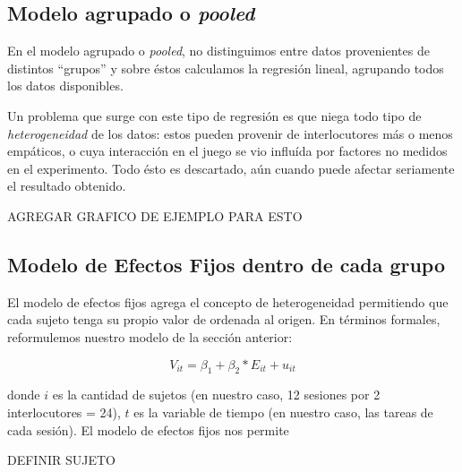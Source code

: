 \subsection{Modelo agrupado o \emph{pooled}}

En el modelo agrupado o \emph{pooled}, no distinguimos entre datos provenientes de distintos ``grupos'' \cite{gujarati1999} y sobre éstos calculamos la regresión lineal, agrupando todos los datos disponibles.

Un problema que surge con este tipo de regresión es que niega todo tipo de \emph{heterogeneidad} de los datos: estos pueden provenir de interlocutores más o menos empáticos, o cuya interacción en el juego se vio influída por factores no medidos en el experimento. Todo ésto es descartado, aún cuando puede afectar seriamente  el resultado obtenido.

AGREGAR GRAFICO DE EJEMPLO PARA ESTO

\subsection{Modelo de Efectos Fijos dentro de cada grupo}


El modelo de efectos fijos agrega el concepto de heterogeneidad permitiendo que cada sujeto tenga su propio valor de ordenada al origen. En términos formales, reformulemos nuestro modelo de la sección anterior:

\begin{equation}
  V_{it} = \beta_1 + \beta_2 * E_{it} + u_{it}
\end{equation}

donde $i$ es la cantidad de sujetos (en nuestro caso, 12 sesiones por 2 interlocutores = 24), $t$ es la variable de tiempo (en nuestro caso, las tareas de cada sesión). El modelo de efectos fijos nos permite


DEFINIR SUJETO

